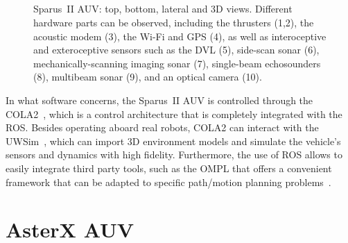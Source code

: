 \begin{figure}[htbp]
    \myfloatalign
    \\
     \\%
    \\
    \\ %
    \caption[Sparus~II AUV: top, bottom, lateral and 3D views, and its hardware
    elements.] 
    {Sparus~II AUV: top, bottom, lateral and 3D views. Different hardware parts
    can be observed, including the thrusters (1,2), the acoustic modem (3), the
    Wi-Fi and GPS (4), as well as interoceptive and exteroceptive sensors such
    as the DVL (5), side-scan sonar (6), mechanically-scanning imaging sonar
    (7), single-beam echosounders (8), multibeam sonar (9), and an optical
    camera (10).}
    \label{fig:Sparus2FullViews}
\end{figure}

In what software concerns, the Sparus~II \ac{AUV} is controlled through the
\acf{COLA2}~\cite{Palomeras2012}, which is a control architecture that is
completely integrated with the \acf{ROS}. Besides operating aboard real robots,
\ac{COLA2} can interact with the \acf{UWSim}~\cite{Prats2012}, which can import
\ac{3D} environment models and simulate the vehicle's sensors and dynamics with
high fidelity. Furthermore, the use of \ac{ROS} allows to easily integrate third
party tools, such as the \acf{OMPL} that offers a convenient framework that can
be adapted to specific path/motion planning problems~\cite{Sucan2012}.


\section{AsterX AUV}

